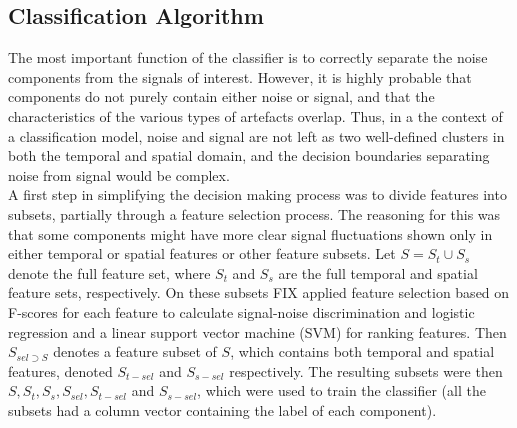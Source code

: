 \subsection{Classification Algorithm}

The most important function of the classifier is to correctly separate the noise components from the signals of interest. However, it is highly probable that components do not purely contain either noise or signal, and that the characteristics of the various types of artefacts overlap. Thus, in a the context of a classification model, noise and signal are not left as two well-defined clusters in both the temporal and spatial domain, and the decision boundaries separating noise from signal would be complex. \cite{Salimi-Khorshidi2014} \\
A first step in simplifying the decision making process was to divide features into subsets, partially through a feature selection process. The reasoning for this was that some components might have more clear signal fluctuations shown only in either temporal or spatial features or other feature subsets. Let $S = S_t{\cup}S_s$ denote the full feature set, where $S_t$ and $S_s$ are the full temporal and spatial feature sets, respectively. On these subsets FIX applied feature selection based on F-scores for each feature to calculate signal-noise discrimination and logistic regression and a linear support vector machine (SVM) for ranking features. Then $S_{sel{\supset}S}$ denotes a feature subset of $S$, which contains both temporal and spatial features, denoted $S_{t-sel}$ and $S_{s-sel}$ respectively. The resulting subsets were then $S, S_t, S_s, S_{sel}, S_{t-sel}$ and $S_{s-sel}$, which were used to train the classifier (all the subsets had a column vector containing the label of each component). \\
